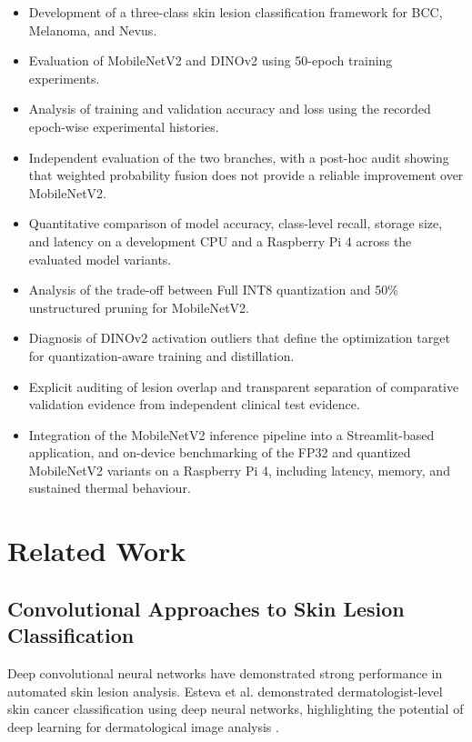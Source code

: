 \documentclass[3p,times,procedia]{elsarticle}
\begin{document}
\begin{itemize}
    \item Development of a three-class skin lesion classification framework for BCC, Melanoma, and Nevus.
    \item Evaluation of MobileNetV2 and DINOv2 using 50-epoch training experiments.
    \item Analysis of training and validation accuracy and loss using the recorded epoch-wise experimental histories.
    \item Independent evaluation of the two branches, with a post-hoc audit showing that weighted probability fusion does not provide a reliable improvement over MobileNetV2.
    \item Quantitative comparison of model accuracy, class-level recall, storage size, and latency on a development CPU and a Raspberry Pi 4 across the evaluated model variants.
    \item Analysis of the trade-off between Full INT8 quantization and 50\% unstructured pruning for MobileNetV2.
    \item Diagnosis of DINOv2 activation outliers that define the optimization target for quantization-aware training and distillation.
    \item Explicit auditing of lesion overlap and transparent separation of comparative validation evidence from independent clinical test evidence.
    \item Integration of the MobileNetV2 inference pipeline into a Streamlit-based application, and on-device benchmarking of the FP32 and quantized MobileNetV2 variants on a Raspberry Pi 4, including latency, memory, and sustained thermal behaviour.
\end{itemize}

\section{Related Work}
\label{sec:relatedwork}

\subsection{Convolutional Approaches to Skin Lesion Classification}

Deep convolutional neural networks have demonstrated strong performance in automated skin lesion analysis. Esteva et al. demonstrated dermatologist-level skin cancer classification using deep neural networks, highlighting the potential of deep learning for dermatological image analysis \cite{esteva2017}.
\end{document}
